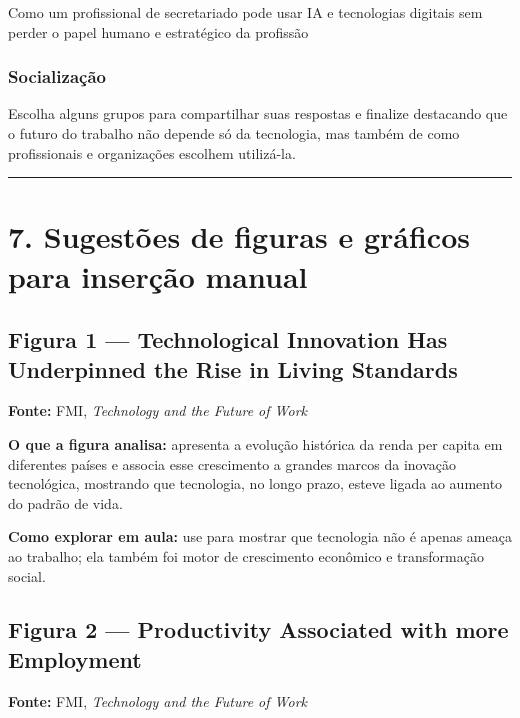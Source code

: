 \documentclass[
]{book}
\theoremstyle{definition}
\theoremstyle{definition}
\theoremstyle{definition}
\theoremstyle{definition}
\theoremstyle{remark}
\begin{document}
Como um profissional de secretariado pode usar IA e tecnologias digitais sem perder o papel humano e estratégico da profissão

\subsection{Socialização}\label{socializauxe7uxe3o}

Escolha alguns grupos para compartilhar suas respostas e finalize destacando que o futuro do trabalho não depende só da tecnologia, mas também de como profissionais e organizações escolhem utilizá-la.

\begin{center}\rule{0.5\linewidth}{0.5pt}\end{center}

\chapter{7. Sugestões de figuras e gráficos para inserção manual}\label{sugestuxf5es-de-figuras-e-gruxe1ficos-para-inseruxe7uxe3o-manual}

\section{Figura 1 --- Technological Innovation Has Underpinned the Rise in Living Standards}\label{figura-1-technological-innovation-has-underpinned-the-rise-in-living-standards}

\textbf{Fonte:} FMI, \emph{Technology and the Future of Work}

\textbf{O que a figura analisa:} apresenta a evolução histórica da renda per capita em diferentes países e associa esse crescimento a grandes marcos da inovação tecnológica, mostrando que tecnologia, no longo prazo, esteve ligada ao aumento do padrão de vida.

\textbf{Como explorar em aula:} use para mostrar que tecnologia não é apenas ameaça ao trabalho; ela também foi motor de crescimento econômico e transformação social.

\section{Figura 2 --- Productivity Associated with more Employment}\label{figura-2-productivity-associated-with-more-employment}

\textbf{Fonte:} FMI, \emph{Technology and the Future of Work}
\end{document}
